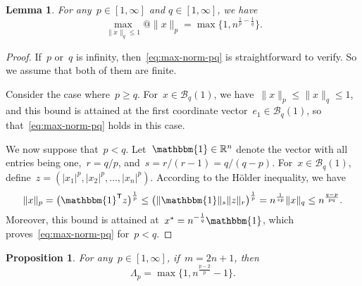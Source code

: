 \documentclass{article}
\numberwithin{equation}{section}
\theoremstyle{definition}
\theoremstyle{plain}
\newtheorem{proposition}{Proposition}[section]
\newtheorem{lemma}{Lemma}[section]
\theoremstyle{remark}
\newcommand*{\abs}[2][]{#1\lvert#2#1\rvert}
\newcommand*{\norm}[2][]{#1\lVert#2#1\rVert}
\newcommand*{\R}{\mathbb{R}}
\newcommand*{\set}[2][]{#1\{#2#1\}}
\newcommand*{\T}{\mathsf{T}}
\newcommand{\ones}{\mathbbm{1}}
\begin{document}
\begin{lemma}
    \label{lem:max-norm-pq}
    For any~$p\in[1,\infty]$ and $q \in [1,\infty]$, we have
    \begin{equation}
        \label{eq:max-norm-pq}
        \max_{\norm{x}_q \le 1} @ \norm{x}_p= \max\{1, n^{\frac{1}{p}-\frac{1}{q}}\}.
    \end{equation}
\end{lemma}

\begin{proof}
    If~$p$ or~$q$ is infinity, then~\eqref{eq:max-norm-pq} is straightforward to verify. So we
    assume that both of them are finite.

    Consider the case where~$p \ge q$.
    For~$x \in \mathcal{B}_q(1)$, we have~$\norm{x}_p \le \norm{x}_q \le 1$, and this bound is attained at the
    first coordinate vector~$e_1 \in \mathcal{B}_q(1)$, so that~\eqref{eq:max-norm-pq} holds in this
    case.

    We now suppose that~$p < q$.
    Let~$\ones \in \R^n$ denote the vector with all entries being one,~$r = q/p$, and~$s = r / (r - 1) = q / (q - p)$.
    For~$x \in \mathcal{B}_q(1)$, define~$z = (\abs{x_1}^p, \abs{x_2}^p, \dots, \abs{x_n}^p)$.
    According to the H{\"{o}}lder inequality, we have
    \begin{equation*}
        \norm{x}_p  = \big(\ones^{\T} z \big)^{\frac{1}{p}} \le \big(\norm{\ones}_s \norm{z}_r \big)
        ^{\frac{1}{p}} = n^{\frac{1}{sp}} \norm{x}_q \le n^{\frac{q - p}{pq}}.
    \end{equation*}
    Moreover, this bound is attained at~$x^\ast = n^{-\frac{1}{q}}\ones$, which proves~\eqref{eq:max-norm-pq} for~$p<q$.
\end{proof}

\begin{proposition}
    \label{prop:lambda-p-opt}
    For any~$p \in [1,\infty]$, if~$m = 2n + 1$, then
    \begin{equation*}
        \Lambda_p = \max \set[\big]{1, n^{\frac{p - 2}{p}} - 1}.
    \end{equation*}
\end{proposition}
\end{document}
